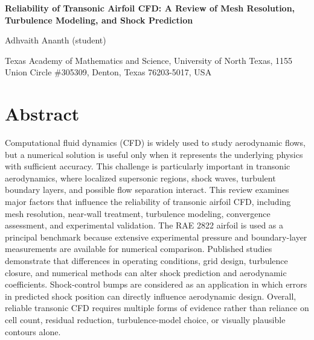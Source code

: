 \documentclass[10pt]{article}
\begin{document}

{\fontsize{16}{17}\selectfont\bfseries
Reliability of Transonic Airfoil CFD: A Review of Mesh Resolution,
Turbulence Modeling, and Shock Prediction
\par}

\vspace{8pt}


Adhvaith Ananth (student)

Texas Academy of Mathematics and Science,
University of North Texas,
1155 Union Circle \#305309,
Denton, Texas 76203-5017, USA


\vspace{8pt}


\section{Abstract}

Computational fluid dynamics (CFD) is widely used to study aerodynamic
flows, but a numerical solution is useful only when it represents the
underlying physics with sufficient accuracy. This challenge is
particularly important in transonic aerodynamics, where localized
supersonic regions, shock waves, turbulent boundary layers, and possible
flow separation interact. This review examines major factors that
influence the reliability of transonic airfoil CFD, including mesh
resolution, near-wall treatment, turbulence modeling, convergence
assessment, and experimental validation. The RAE 2822 airfoil is used
as a principal benchmark because extensive experimental pressure and
boundary-layer measurements are available for numerical comparison.
Published studies demonstrate that differences in operating conditions,
grid design, turbulence closure, and numerical methods can alter shock
prediction and aerodynamic coefficients. Shock-control bumps are
considered as an application in which errors in predicted shock position
can directly influence aerodynamic design. Overall, reliable transonic
CFD requires multiple forms of evidence rather than reliance on cell
count, residual reduction, turbulence-model choice, or visually
plausible contours alone.
\end{document}
